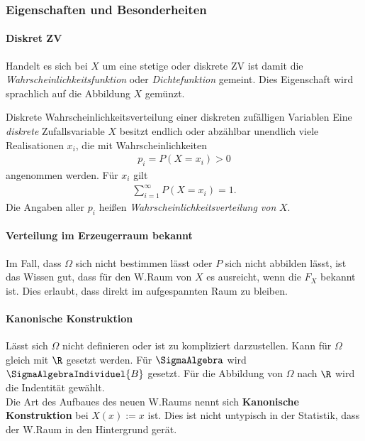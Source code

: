 \subsubsection{Eigenschaften und Besonderheiten}
\paragraph{Diskret ZV}
Handelt es sich bei $X$ um eine stetige oder diskrete \gls{ZV} ist damit die \textit{Wahrscheinlichkeitsfunktion} oder \textit{Dichtefunktion} gemeint. Dies Eigenschaft wird sprachlich auf die Abbildung $X$ gemünzt.\\

\begin{Definition}{Diskrete Wahrscheinlichkeitsverteilung einer diskreten zufälligen Variablen}
	Eine \textit{diskrete} Zufallsvariable $X$ besitzt endlich oder abzählbar unendlich viele Realisationen $x_i$, die mit Wahrscheinlichkeiten 
	\begin{align*}
		p_i = P(X=x_i) > 0
	\end{align*}
	angenommen werden. Für $x_i$ gilt
	\begin{align*}
		\sum_{i=1}^{\infty} P(X=x_i) = 1.
	\end{align*}
	Die Angaben aller $p_i$ heißen \textit{Wahrscheinlichkeitsverteilung von} $X$.
\end{Definition}

\paragraph{Verteilung im Erzeugerraum bekannt}
Im Fall, dass $\Omega$ sich nicht bestimmen lässt oder $P$ sich nicht abbilden lässt, ist das Wissen gut, dass für den \gls{W.}Raum von $X$ es ausreicht, wenn die $F_X$ bekannt ist. Dies erlaubt, dass direkt im aufgespannten Raum zu bleiben.

\paragraph{Kanonische Konstruktion}
Lässt sich $\Omega$ nicht definieren oder ist zu kompliziert darzustellen. Kann für $\Omega$ gleich mit $\R$ gesetzt werden. Für $\SigmaAlgebra$ wird $\SigmaAlgebraIndividuel{B}$ gesetzt. Für die Abbildung von $\Omega$ nach $\R$ wird die Indentität gewählt.\\

Die Art des Aufbaues des neuen \gls{W.}Raums nennt sich \textbf{Kanonische Konstruktion} bei $X(x):= x$ ist. Dies ist nicht untypisch in der Statistik, dass der \gls{W.}Raum \WRaum in den Hintergrund gerät.

